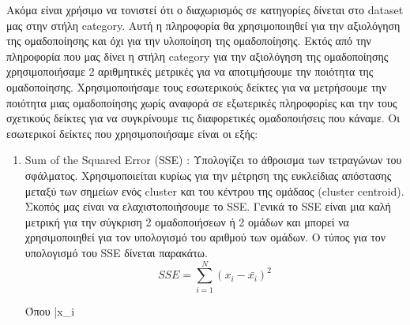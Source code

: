 Ακόμα είναι χρήσιμο να τονιστεί ότι ο διαχωρισμός σε κατηγορίες δίνεται στο dataset μας στην στήλη category. Αυτή η πληροφορία θα χρησιμοποιηθεί για την αξιολόγηση της ομαδοποίησης και όχι για την υλοποίηση της ομαδοποίησης. Εκτός από την πληροφορία που μας δίνει η στήλη category για την αξιολόγηση της ομαδοποίησης χρησιμοποιήσαμε 2 αριθμητικές μετρικές για να αποτιμήσουμε την ποιότητα της ομαδοποίησης. Χρησιμοποιήσαμε τους εσωτερικούς δείκτες για να μετρήσουμε την ποιότητα μιας ομαδοποίησης χωρίς αναφορά σε εξωτερικές πληροφορίες και την τους σχετικούς δείκτες για να συγκρίνουμε τις διαφορετικές ομαδοποιήσεις που κάναμε. Οι εσωτερικοί δείκτες που χρησιμοποιήσαμε είναι οι εξής:

\begin{enumerate}
	\item Sum of the Squared Error (SSE) : Υπολογίζει το άθροισμα των τετραγώνων του σφάλματος. Χρησιμοποιείται κυρίως για την μέτρηση της ευκλείδιας απόστασης μεταξύ των σημείων ενός cluster και του κέντρου της ομάδαος (cluster centroid). Σκοπός μας είναι να ελαχιστοποιήσουμε το SSE. Γενικά το SSE είναι μια καλή μετρική για την σύγκριση 2 ομαδοποιήσεων ή 2 ομάδων και μπορεί να χρησιμοποιηθεί για τον υπολογισμό του αριθμού των ομάδων. Ο τύπος για τον υπολογισμό του SSE δίνεται παρακάτω.
	\begin{equation}
	SSE=\sum_{i=1}^{N}{(x_i-\bar{x_i})^2}
	\end{equation}
	
	Όπου \bar{x_i}
\end{enumerate}

